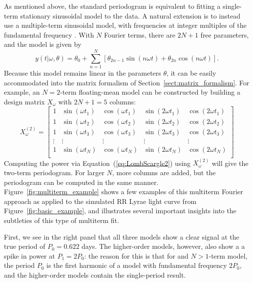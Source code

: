 \documentclass{emulateapj}
\newcommand{\Fig}[1]{Figure~\ref{fig:#1}}
\newcommand{\fig}[1]{\Fig{#1}}
\newcommand{\Eq}[1]{Equation~(\ref{eq:#1})}
\newcommand{\eq}[1]{\Eq{#1}}
\newcommand{\Sect}[1]{Section~\ref{sect:#1}}
\newcommand{\sect}[1]{\Sect{#1}}
\begin{document}
As mentioned above, the standard periodogram is equivalent to fitting a single-term stationary sinusoidal model to the data. A natural extension is to instead use a multiple-term sinusoidal model, with frequencies at integer multiples of the fundamental frequency \citep[See e.g.][]{Bretthorst88}. With $N$ Fourier terms, there are $2N + 1$ free parameters, and the model is given by
\begin{equation}
  y(t|\omega,\theta) = \theta_0 + \sum_{n=1}^N \left[\theta_{2n - 1}\sin(n\omega t) + \theta_{2n}\cos(n\omega t)\right].
\end{equation}
Because this model remains linear in the parameters $\theta$, it can be easily accommodated into the matrix formalism of \sect{matrix_formalism}. For example, an $N = 2$-term floating-mean model can be constructed by building a design matrix $X_\omega$ with $2N + 1 = 5$ columns:
\begin{equation}
X_\omega^{(2)} = \left[
\begin{array}{ccccc}
1 & \sin(\omega t_1) & \cos(\omega t_1) & \sin(2\omega t_1) & \cos(2\omega t_1)\\
1 & \sin(\omega t_2) & \cos(\omega t_2) & \sin(2\omega t_2) & \cos(2\omega t_2)\\
1 & \sin(\omega t_3) & \cos(\omega t_3) & \sin(2\omega t_3) & \cos(2\omega t_3)\\
\vdots & \vdots & \vdots & \vdots & \vdots \\
1 & \sin(\omega t_N) & \cos(\omega t_N) & \sin(2\omega t_N) & \cos(2\omega t_N)\\
\end{array}
\right]
\end{equation}
Computing the power via \eq{LombScargle2} using $X_\omega^{(2)}$ will give the two-term periodogram. For larger $N$, more columns are added, but the periodogram can be computed in the same manner. \fig{multiterm_example} shows a few examples of this multiterm Fourier approach as applied to the simulated RR Lyrae light curve from \fig{basic_example}, and illustrates several important insights into the subtleties of this type of multiterm fit.

First, we see in the right panel that all three models show a clear signal at the true period of $P_0 = 0.622$ days. The higher-order models, however, also show a a spike in power at $P_1 = 2 P_0$: the reason for this is that for and $N>1$-term model, the period $P_0$ is the first harmonic of a model with fundamental frequency $2P_0$, and the higher-order models contain the single-period result.
\end{document}
